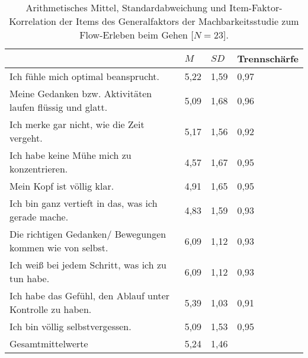 \newpage
\begin{table}
	[!htb] \centering \caption[Item-Faktor-Korrelation der Items des Generalfaktors (Gehstudie -- intraindividuell).]{Arithmetisches Mittel, Standardabweichung und Item-Faktor-Korrelation der Items des Generalfaktors der Machbarkeitsstudie zum Flow-Erleben beim Gehen [$N = 23$].} \label{tab:generalfaktor_2} 
	\begin{tabularx}
		{ 
		\textwidth}{p{} p{} p{} p{}} \toprule & $M$ & $SD$ & Trennschärfe \\
		\midrule Ich fühle mich optimal beansprucht. & 5,22 & 1,59 & 0,97 \\
		Meine Gedanken bzw. Aktivitäten laufen flüssig und glatt. & 5,09 & 1,68 & 0,96 \\
		Ich merke gar nicht, wie die Zeit vergeht. & 5,17 & 1,56 & 0,92 \\
		Ich habe keine Mühe mich zu konzentrieren. & 4,57 & 1,67 & 0,95 \\
		Mein Kopf ist völlig klar. & 4,91 & 1,65 & 0,95 \\
		Ich bin ganz vertieft in das, was ich gerade mache. & 4,83 & 1,59 & 0,93 \\
		Die richtigen Gedanken/ Bewegungen kommen wie von selbst. & 6,09 & 1,12 & 0,93 \\
		Ich weiß bei jedem Schritt, was ich zu tun habe. & 6,09 & 1,12 & 0,93 \\
		Ich habe das Gefühl, den Ablauf unter Kontrolle zu haben. & 5,39 & 1,03 & 0,91 \\
		Ich bin völlig selbstvergessen. & 5,09 & 1,53 & 0,95 \\
		Gesamtmittelwerte & 5,24 & 1,46 & \\
		\bottomrule 
	\end{tabularx}
\end{table}
